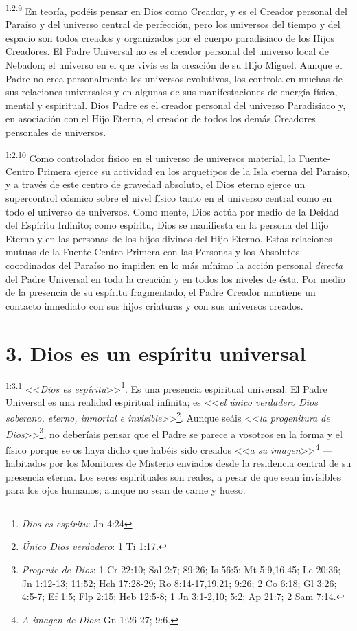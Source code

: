 \par
\textsuperscript{1:2.9} En teoría, podéis pensar en Dios como Creador, y es el Creador personal del Paraíso y del universo central de perfección, pero los universos del tiempo y del espacio son todos creados y organizados por el cuerpo paradisiaco de los Hijos Creadores. El Padre Universal no es el creador personal del universo local de Nebadon; el universo en el que vivís es la creación de su Hijo Miguel. Aunque el Padre no crea personalmente los universos evolutivos, los controla en muchas de sus relaciones universales y en algunas de sus manifestaciones de energía física, mental y espiritual. Dios Padre es el creador personal del universo Paradisiaco y, en asociación con el Hijo Eterno, el creador de todos los demás Creadores personales de universos.

\par
\textsuperscript{1:2.10} Como controlador físico en el universo de universos material, la Fuente-Centro Primera ejerce su actividad en los arquetipos de la Isla eterna del Paraíso, y a través de este centro de gravedad absoluto, el Dios eterno ejerce un supercontrol cósmico sobre el nivel físico tanto en el universo central como en todo el universo de universos. Como mente, Dios actúa por medio de la Deidad del Espíritu Infinito; como espíritu, Dios se manifiesta en la persona del Hijo Eterno y en las personas de los hijos divinos del Hijo Eterno. Estas relaciones mutuas de la Fuente-Centro Primera con las Personas y los Absolutos coordinados del Paraíso no impiden en lo más mínimo la acción personal \textit{directa} del Padre Universal en toda la creación y en todos los niveles de ésta. Por medio de la presencia de su espíritu fragmentado, el Padre Creador mantiene un contacto inmediato con sus hijos criaturas y con sus universos creados.

\section*{3. Dios es un espíritu universal}
\par
\textsuperscript{1:3.1} <<\textit{Dios es espíritu}>>\footnote{\textit{Dios es espíritu}: Jn 4:24}. Es una presencia espiritual universal. El Padre Universal es una realidad espiritual infinita; es <<\textit{el único verdadero Dios soberano, eterno, inmortal e invisible}>>\footnote{\textit{Único Dios verdadero}: 1 Ti 1:17.}. Aunque seáis <<\textit{la progenitura de Dios}>>\footnote{\textit{Progenie de Dios}: 1 Cr 22:10; Sal 2:7; 89:26; Is 56:5; Mt 5:9,16,45; Lc 20:36; Jn 1:12-13; 11:52; Hch 17:28-29; Ro 8:14-17,19,21; 9:26; 2 Co 6:18; Gl 3:26; 4:5-7; Ef 1:5; Flp 2:15; Heb 12:5-8; 1 Jn 3:1-2,10; 5:2; Ap 21:7; 2 Sam 7:14.}, no deberíais pensar que el Padre se parece a vosotros en la forma y el físico porque se os haya dicho que habéis sido creados <<\textit{a su imagen}>>\footnote{\textit{A imagen de Dios}: Gn 1:26-27; 9:6.} ---habitados por los Monitores de Misterio enviados desde la residencia central de su presencia eterna. Los seres espirituales son reales, a pesar de que sean invisibles para los ojos humanos; aunque no sean de carne y hueso.

